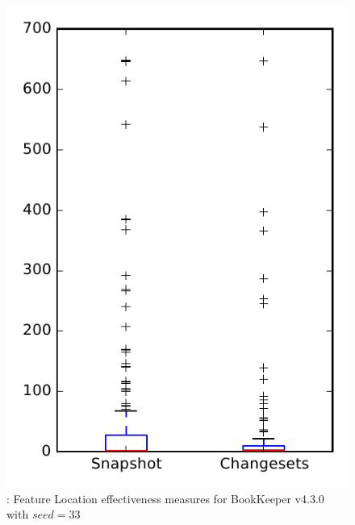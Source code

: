 
\begin{figure}
\centering
\includegraphics[height=0.4\textheight]{figures/flt_seed/rq1_bookkeeper_33}
\caption{\rone: Feature Location effectiveness measures for BookKeeper v4.3.0 with $seed=33$}
\label{fig:flt_seed:rq1:bookkeeper}
\end{figure}
